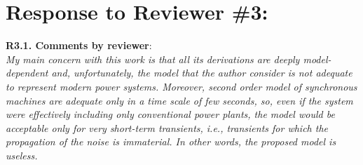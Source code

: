 \documentclass[12pt,onecolumn]{IEEEtran}
\begin{document}

\newpage
\section*{\large \bf Response to Reviewer \#3:}

\noindent
{\bf R3.1. Comments by reviewer}:\\
{\em My main concern with this work is that all its derivations are deeply model-dependent and, unfortunately, the model that the author consider is not adequate to represent modern power systems. Moreover, second order model of synchronous machines are adequate only in a time scale of few seconds, so, even if the system were effectively including only conventional power plants, the model would be acceptable only for very short-term transients, i.e., transients for which the propagation of the noise is immaterial. In other words, the proposed model is useless.}
\end{document}
